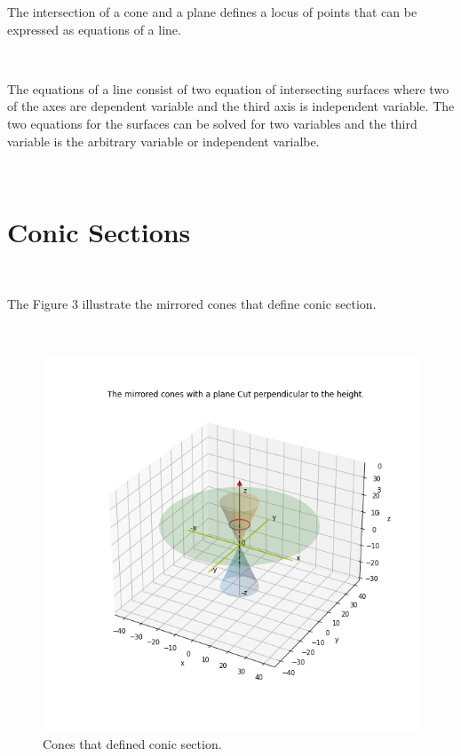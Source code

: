 \documentclass[10pt,a4paper,leqno]{article}
\begin{document}
\begin{CJK*}{UTF8}{gbsn}
\noindent The intersection of a cone and a plane defines a locus of points that can be expressed as equations of a line.
 \par \ \par\noindent The equations of a line consist of two equation of intersecting surfaces where two of the axes are dependent variable and the third axis is independent variable. The two equations for the surfaces can be solved for two variables and the third variable is the arbitrary variable or independent varialbe.
 \par \ \par\noindent \section{Conic Sections }
 \par \ \par\noindent The Figure 3 illustrate the mirrored cones that define conic section.
 \par \ \par\begin{figure}[H]
\centering\includegraphics[width=1\linewidth,height=0.3\textheight]{Data/fgr03.png}
\caption{Cones that defined conic section.}
\label{fig:Data/fgr03.png}
\end{figure}


\end{CJK*}
\end{document}
